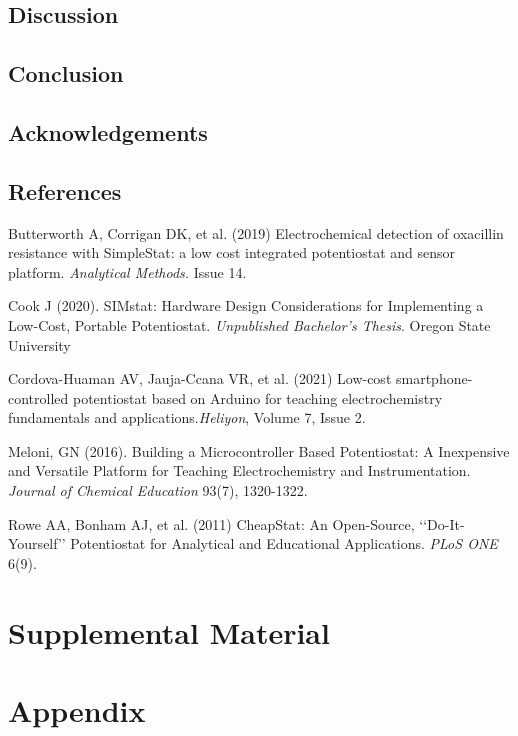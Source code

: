 \documentclass{article}
\begin{document}
\subsection*{Discussion}
\subsection*{Conclusion}
\subsection*{Acknowledgements}
\subsection*{References}
Butterworth A, Corrigan DK, et al. (2019) Electrochemical detection of oxacillin resistance with SimpleStat: a low cost integrated potentiostat and sensor platform. \emph{Analytical Methods.} Issue 14. 

Cook J (2020). SIMstat: Hardware Design Considerations for Implementing a Low-Cost, Portable Potentiostat. \emph{Unpublished Bachelor's Thesis}. Oregon State University

Cordova-Huaman AV, Jauja-Ccana VR, et al. (2021) Low-cost smartphone-controlled potentiostat based on Arduino for teaching electrochemistry fundamentals and applications.\emph{Heliyon}, Volume 7, Issue 2. 

Meloni, GN (2016). Building a Microcontroller Based Potentiostat: A Inexpensive and Versatile Platform for Teaching Electrochemistry and Instrumentation. \emph{Journal of Chemical Education} 93(7), 1320-1322. 

Rowe AA, Bonham AJ, et al. (2011) CheapStat: An Open-Source, ‘‘Do-It-Yourself’’ Potentiostat for Analytical and Educational Applications. \emph{PLoS ONE} 6(9).

\newpage
\section*{Supplemental Material}

\newpage
\section*{Appendix}
\end{document}
